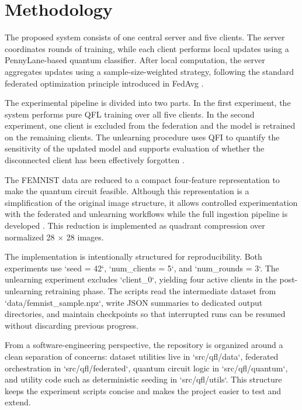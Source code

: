 \section{Methodology}
\label{sec:methodology}

The proposed system consists of one central server and five clients. The server coordinates rounds of training, while each client performs local updates using a PennyLane-based quantum classifier. After local computation, the server aggregates updates using a sample-size-weighted strategy, following the standard federated optimization principle introduced in FedAvg \cite{fedavg}.

The experimental pipeline is divided into two parts. In the first experiment, the system performs pure QFL training over all five clients. In the second experiment, one client is excluded from the federation and the model is retrained on the remaining clients. The unlearning procedure uses QFI to quantify the sensitivity of the updated model and supports evaluation of whether the disconnected client has been effectively forgotten \cite{qfi,federated_unlearning_active_forgetting,forgettable_federated_linear_learning}.

The FEMNIST data are reduced to a compact four-feature representation to make the quantum circuit feasible. Although this representation is a simplification of the original image structure, it allows controlled experimentation with the federated and unlearning workflows while the full ingestion pipeline is developed \cite{leaf}. This reduction is implemented as quadrant compression over normalized 28 \(\times\) 28 images.

The implementation is intentionally structured for reproducibility. Both experiments use `seed = 42`, `num_clients = 5`, and `num_rounds = 3`. The unlearning experiment excludes `client_0`, yielding four active clients in the post-unlearning retraining phase. The scripts read the intermediate dataset from `data/femnist_sample.npz`, write JSON summaries to dedicated output directories, and maintain checkpoints so that interrupted runs can be resumed without discarding previous progress.

From a software-engineering perspective, the repository is organized around a clean separation of concerns: dataset utilities live in `src/qfl/data`, federated orchestration in `src/qfl/federated`, quantum circuit logic in `src/qfl/quantum`, and utility code such as deterministic seeding in `src/qfl/utils`. This structure keeps the experiment scripts concise and makes the project easier to test and extend.
